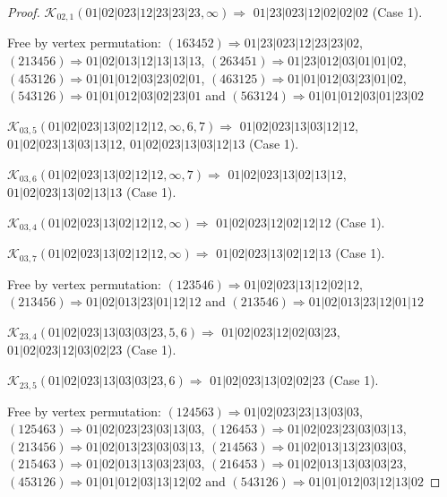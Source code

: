 \documentclass[12pt]{article}
\theoremstyle{plain}
\theoremstyle{definition}
\theoremstyle{remark}
\newcommand{\fancy}[1]{\mathcal{#1}}
\def\K{\fancy{K}}
\begin{document}
\begin{proof}
	$\K_{02,1}(01|02|023|12|23|23|23,\infty)\Rightarrow $ $01|23|023|12|02|02|02$ (Case 1).
	
	
	
	Free by vertex permutation: $(1 6 3 4 5 2)\Rightarrow 01|23|023|12|23|23|02$, $(2 1 3 4 5 6)\Rightarrow 01|02|013|12|13|13|13$, $(2 6 3 4 5 1)\Rightarrow 01|23|012|03|01|01|02$, $(4 5 3 1 2 6)\Rightarrow 01|01|012|03|23|02|01$, $(4 6 3 1 2 5)\Rightarrow 01|01|012|03|23|01|02$, $(5 4 3 1 2 6)\Rightarrow 01|01|012|03|02|23|01$ and $(5 6 3 1 2 4)\Rightarrow 01|01|012|03|01|23|02$
	
	
	
	\bigskip
	
	$\K_{03,5}(01|02|023|13|02|12|12,\infty,6, 7)\Rightarrow $ $01|02|023|13|03|12|12$, $01|02|023|13|03|13|12$, $01|02|023|13|03|12|13$ (Case 1).
	
	$\K_{03,6}(01|02|023|13|02|12|12,\infty,7)\Rightarrow $ $01|02|023|13|02|13|12$, $01|02|023|13|02|13|13$ (Case 1).
	
	$\K_{03,4}(01|02|023|13|02|12|12,\infty)\Rightarrow $ $01|02|023|12|02|12|12$ (Case 1).
	
	$\K_{03,7}(01|02|023|13|02|12|12,\infty)\Rightarrow $ $01|02|023|13|02|12|13$ (Case 1).
	
	
	
	Free by vertex permutation: $(1 2 3 5 4 6)\Rightarrow 01|02|023|13|12|02|12$, $(2 1 3 4 5 6)\Rightarrow 01|02|013|23|01|12|12$ and $(2 1 3 5 4 6)\Rightarrow 01|02|013|23|12|01|12$
	
	
	
	\bigskip
	
	$\K_{23,4}(01|02|023|13|03|03|23,5, 6)\Rightarrow $ $01|02|023|12|02|03|23$, $01|02|023|12|03|02|23$ (Case 1).
	
	$\K_{23,5}(01|02|023|13|03|03|23,6)\Rightarrow $ $01|02|023|13|02|02|23$ (Case 1).
	
	
	
	Free by vertex permutation: $(1 2 4 5 6 3)\Rightarrow 01|02|023|23|13|03|03$, $(1 2 5 4 6 3)\Rightarrow 01|02|023|23|03|13|03$, $(1 2 6 4 5 3)\Rightarrow 01|02|023|23|03|03|13$, $(2 1 3 4 5 6)\Rightarrow 01|02|013|23|03|03|13$, $(2 1 4 5 6 3)\Rightarrow 01|02|013|13|23|03|03$, $(2 1 5 4 6 3)\Rightarrow 01|02|013|13|03|23|03$, $(2 1 6 4 5 3)\Rightarrow 01|02|013|13|03|03|23$, $(4 5 3 1 2 6)\Rightarrow 01|01|012|03|13|12|02$ and $(5 4 3 1 2 6)\Rightarrow 01|01|012|03|12|13|02$
	
	
	
	\bigskip
	

\end{proof}
\end{document}
